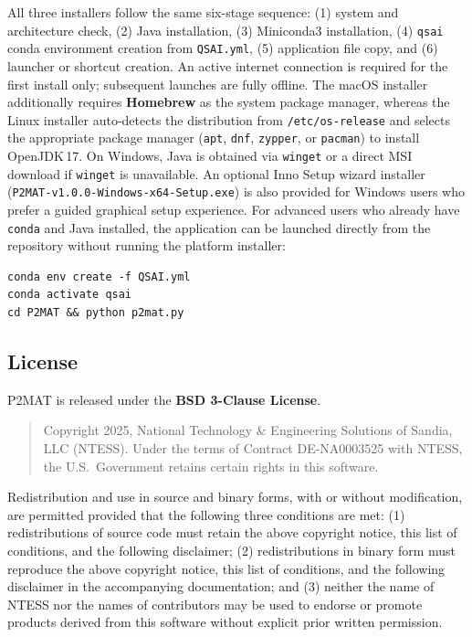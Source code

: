 All three installers follow the same six-stage sequence: (1) system and
architecture check, (2) Java installation, (3) Miniconda3 installation,
(4) \texttt{qsai} conda environment creation from \texttt{QSAI.yml},
(5) application file copy, and (6) launcher or shortcut creation.
An active internet connection is required for the first install only;
subsequent launches are fully offline.
The macOS installer additionally requires \textbf{Homebrew} as the system
package manager, whereas the Linux installer auto-detects the distribution
from \texttt{/etc/os-release} and selects the appropriate package manager
(\texttt{apt}, \texttt{dnf}, \texttt{zypper}, or \texttt{pacman}) to install
OpenJDK\,17.
On Windows, Java is obtained via \texttt{winget} or a direct MSI download
if \texttt{winget} is unavailable.
An optional Inno Setup wizard installer
(\texttt{P2MAT-v1.0.0-Windows-x64-Setup.exe}) is also provided for Windows
users who prefer a guided graphical setup experience.
For advanced users who already have \texttt{conda} and Java installed, the
application can be launched directly from the repository without running the
platform installer:

\begin{verbatim}
conda env create -f QSAI.yml
conda activate qsai
cd P2MAT && python p2mat.py
\end{verbatim}

\subsection{License}
\label{subsec:license}

P2MAT is released under the \textbf{BSD 3-Clause License}.

\begin{quote}
Copyright \textcopyright{} 2025, National Technology \& Engineering Solutions
of Sandia, LLC (NTESS).
Under the terms of Contract DE-NA0003525 with NTESS, the U.S.\ Government
retains certain rights in this software.
\end{quote}

Redistribution and use in source and binary forms, with or without
modification, are permitted provided that the following three conditions are
met:
(1) redistributions of source code must retain the above copyright notice, this
list of conditions, and the following disclaimer;
(2) redistributions in binary form must reproduce the above copyright notice,
this list of conditions, and the following disclaimer in the accompanying
documentation; and
(3) neither the name of NTESS nor the names of contributors may be used to
endorse or promote products derived from this software without explicit prior
written permission.


